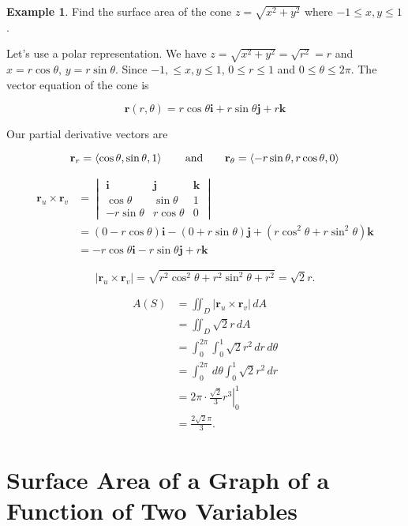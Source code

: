 \documentclass[11pt,oneside,english]{amsart}
\theoremstyle{definition}
\newtheorem*{example}{Example}
\newcommand{\aspace}{\hspace{7mm}\text{and}\hspace{7mm}}
\def\<#1>{\mathinner{\langle#1\rangle}}
\begin{document}
\begin{example}
Find the surface area of the cone $z=\sqrt{x^2+y^2}$ where $-1\leq x,y\leq 1$.

Let's use a polar representation. We have $z=\sqrt{x^2+y^2}=\sqrt{r^2}=r$ and $x=r\cos\theta$, $y=r\sin\theta$. Since $-1,\leq x,y\leq 1$, $0\leq r\leq 1$ and $0\leq \theta\leq 2\pi$. The vector equation of the cone is

\[
\mathbf{r}(r,\theta)=r\cos\theta\mathbf{i}+r\sin\theta\mathbf{j}+r\mathbf{k}
\]

Our partial derivative vectors are

\[
\mathbf{r}_r=\<\cos\theta,\sin\theta,1>\aspace\mathbf{r}_\theta=\<-r\sin\theta,r\cos\theta,0>
\]

\begin{align*}
\mathbf{r}_u\times \mathbf{r}_v&=\begin{vmatrix}\mathbf{i}&\mathbf{j}&\mathbf{k}\\ \cos\theta & \sin\theta & 1\\ -r\sin\theta & r\cos\theta & 0\end{vmatrix}\\[2mm]
&=(0-r\cos\theta)\mathbf{i}-(0+r\sin\theta)\mathbf{j}+(r\cos^2\theta+r\sin^2\theta)\mathbf{k}\\[2mm]
&=-r\cos\theta\mathbf{i}-r\sin\theta\mathbf{j}+r\mathbf{k}
\end{align*}

\[
|\mathbf{r}_u\times\mathbf{r}_v|=\sqrt{r^2\cos^2\theta+r^2\sin^2\theta+r^2}=\sqrt{2}r.
\]



\begin{align*}
A(S)&=\iint_D|\mathbf{r}_u\times\mathbf{r}_v|\,dA\\[2mm]
&=\iint_D\sqrt{2}r\,dA\\[2mm]
&=\int_0^{2\pi}\int_0^1\sqrt{2}r^2\,dr\,d\theta\\[2mm]
&=\int_0^{2\pi}\,d\theta\int_0^1\sqrt{2}r^2\,dr\\[2mm]
&=2\pi\cdot\left.\frac{\sqrt{2}}{3}r^3\right|_0^1\\[2mm]
&=\frac{2\sqrt{2}\pi}{3}.
\end{align*}
\end{example}

\section*{Surface Area of a Graph of a Function of Two Variables}
\end{document}
